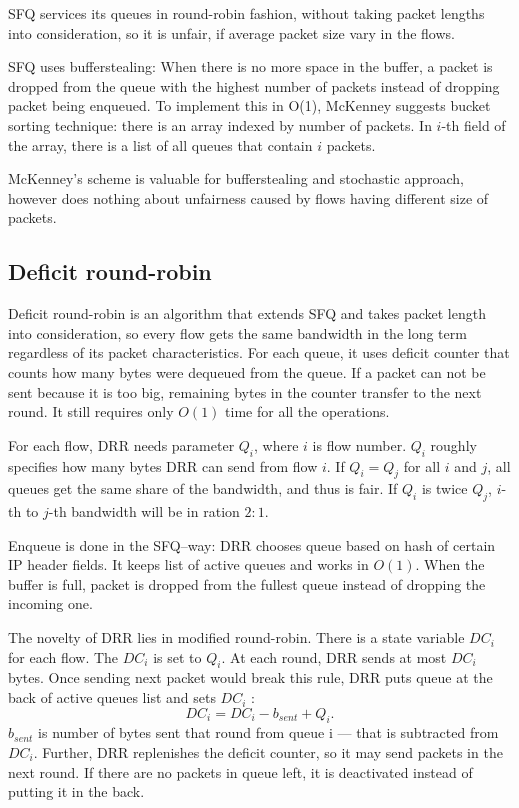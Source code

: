 SFQ services its queues in round-robin fashion, without taking packet lengths into consideration, so it is unfair, if average packet size vary in the flows.

SFQ uses bufferstealing: When there is no more space in the buffer, a packet is dropped from the queue with the highest number of packets instead of dropping packet being enqueued. To implement this in O(1), McKenney suggests bucket sorting technique: there is an array indexed by number of packets. In $i$-th field of the array, there is a list of all queues that contain $i$ packets.

McKenney's scheme is valuable for bufferstealing and stochastic approach, however does nothing about unfairness caused by flows having different size of packets.

\subsection{Deficit round-robin}
\label{DRR}
Deficit round-robin \cite{EffDRR} is an algorithm that extends SFQ and takes packet length into consideration, so every flow gets the same bandwidth in the long term regardless of its packet characteristics. For each queue, it uses deficit counter that counts how many bytes were dequeued from the queue. If a packet can not be sent because it is too big, remaining bytes in the counter transfer to the next round. It still requires only $O(1)$ time for all the operations.

For each flow, DRR needs parameter $Q_i$, where $i$ is flow number. $Q_i$ roughly specifies how many bytes DRR can send from flow $i$. If $Q_i = Q_j$ for all $i$ and $j$, all queues get the same share of the bandwidth, and thus is fair. If $Q_i$ is twice $Q_j$, $i$-th to $j$-th bandwidth will be in ration $2:1$.

Enqueue is done in the SFQ--way: DRR chooses queue based on hash of certain IP header fields. It keeps list of active queues and works in $O(1)$. When the buffer is full, packet is dropped from the fullest queue instead of dropping the incoming one.

The novelty of DRR lies in modified round-robin. There is a state variable $DC_i$ for each flow. The $DC_i$ is set to $Q_i$. At each round, DRR sends at most $DC_i$ bytes. Once sending next packet would break this rule, DRR puts queue  at the back of active queues list and sets $DC_i$ :
\[
  DC_i = DC_i - b_{sent} + Q_i.
\]
$b_{sent}$ is number of bytes sent that round from queue i --- that is subtracted from $DC_i$. Further, DRR replenishes the deficit counter, so it may send packets in the next round. If there are no packets in queue left, it is deactivated instead of putting it in the back.

